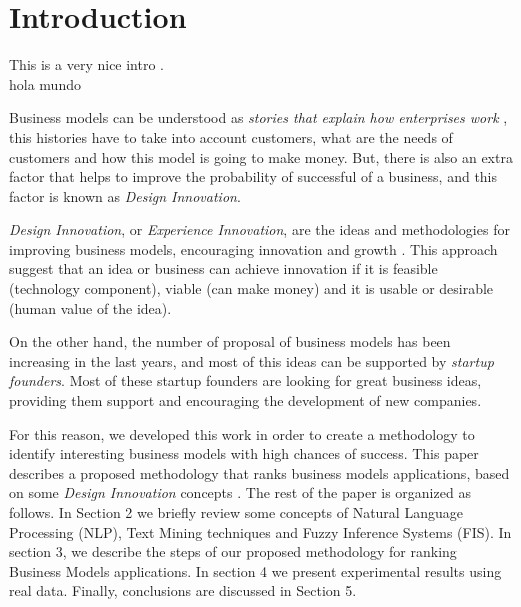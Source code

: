 
\chapter{Introduction}
\label{ch:intro}

This is a very nice intro \cite{leskovec_mining_2014}. \\
hola mundo

Business models can be understood as \textit{stories that explain how enterprises work} \cite{magretta2002business}, this histories have to take into account customers, what are the needs of customers and how this model is going to make money. But, there is also an extra factor that helps to improve the probability of successful of a business, and this factor is known as \textit{Design Innovation}.

\textit{Design Innovation}, or \textit{Experience Innovation}, are the ideas and methodologies for improving business models, encouraging innovation and growth \cite{liedtka2015perspective}. This approach suggest that an idea or business can achieve innovation if it is feasible (technology component), viable (can make money) and it is usable or desirable (human value of the idea). 

On the other hand, the number of proposal of business models has been increasing in the last years, and most of this ideas can be supported by \textit{startup founders}. Most of these startup founders are looking for great business ideas, providing them support and encouraging the development of new companies.

For this reason, we developed this work in order to create a methodology to identify interesting business models with high chances of success. This paper describes a proposed methodology that ranks business models applications, based on some \textit{Design Innovation} concepts \cite{liedtka2015perspective}. The rest of the paper is organized as follows. In Section 2 we briefly review some concepts of Natural Language Processing (NLP), Text Mining techniques and Fuzzy Inference Systems (FIS). In section 3, we describe the steps of our proposed methodology for ranking Business Models applications. In section 4 we present experimental results using real data. Finally, conclusions are discussed in Section 5.  

